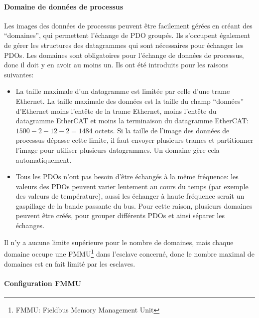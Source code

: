 \documentclass[a4paper,12pt,BCOR=6mm,bibtotoc,idxtotoc]{scrbook}
\begin{document}
\paragraph{Domaine de donn\'ees de processus}

Les images des donn\'ees de processus peuvent \^etre facilement
g\'er\'ees en cr\'eant des ``domaines'', qui permettent l'\'echange de
PDO group\'es. Ils s'occupent \'egalement de g\'erer les structures
des datagrammes qui sont n\'ecessaires pour \'echanger les PDOs.  Les
domaines sont obligatoires pour l'\'echange de donn\'ees de processus,
donc il doit y en avoir au moins un. Ils ont \'et\'e introduits pour
les raisons suivantes:

\begin{itemize}

\item La taille maximale d'un datagramme est limit\'ee par celle d'une
  trame Ethernet. La taille maximale des donn\'ees est la taille du
  champ ``donn\'ees'' d'Ethernet moins l'ent\^ete de la trame
  Ethernet, moins l'ent\^ete du datagramme EtherCAT et moins la
  terminaison du datagramme EtherCAT: $1500 - 2 - 12 - 2 = 1484$
  octets. Si la taille de l'image des donn\'ees de processus d\'epasse
  cette limite, il faut envoyer plusieurs trames et partitionner
  l'image pour utiliser plusieurs datagrammes. Un domaine g\`ere cela
  automatiquement.

\item Tous les PDOs n'ont pas besoin d'\^etre \'echang\'es \`a la
  m\^eme fr\'equence: les valeurs des PDOs peuvent varier lentement au
  cours du temps (par exemple des valeurs de temp\'erature), aussi les
  \'echanger \`a haute fr\'equence serait un gaspillage de la bande
  passante du bus. Pour cette raison, plusieurs domaines peuvent
  \^etre cr\'e\'es, pour grouper diff\'erents PDOs et ainsi s\'eparer
  les \'echanges.

\end{itemize}

Il n'y a aucune limite sup\'erieure pour le nombre de domaines, mais
chaque domaine occupe une FMMU\footnote{FMMU: Fieldbus Memory
Management Unit} dans l'esclave concern\'e, donc le nombre maximal de
domaines est en fait limit\'e par les esclaves.

\paragraph{Configuration FMMU}
\end{document}
